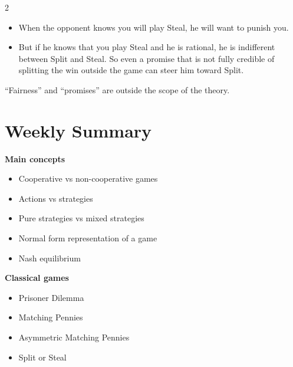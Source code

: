 \documentclass[a4paper,9pt]{extarticle}
\begin{document}
\begin{multicols}{2}
\begin{example}
\begin{itemize}

\item When the opponent knows you will play Steal, he will want to punish you.

\item But if he knows that you play Steal and he is rational, he is indifferent between
Split and Steal. So even a promise that is not fully credible of splitting the win outside
the game can steer him toward Split.

\end{itemize}

\end{example}


\begin{warning}

``Fairness'' and ``promises'' are outside the scope of the theory.

\end{warning}



\section{Weekly Summary}


\begin{summary}

\textbf{Main concepts}

\begin{itemize}

\item Cooperative vs non-cooperative games

\item Actions vs strategies

\item Pure strategies vs mixed strategies

\item Normal form representation of a game

\item Nash equilibrium

\end{itemize}

\textbf{Classical games}

\begin{itemize}

\item Prisoner Dilemma

\item Matching Pennies

\item Asymmetric Matching Pennies

\item Split or Steal

\end{itemize}

\end{summary}



\end{multicols}
\end{document}

